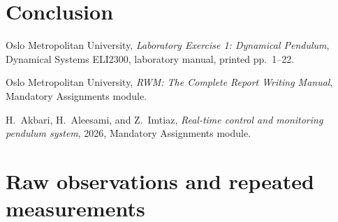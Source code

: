 \documentclass[11pt,a4paper]{article}
\newif\ifdraft
\DeclareRobustCommand{\guide}[1]{\ifdraft\par\smallskip\small\itshape Draft guidance: #1\par\smallskip\fi}
\newcommand{\manual}[1]{\cite[printed pp.~#1]{labmanual}}
\begin{document}
\section{Conclusion}
\label{sec:conclusion}
\guide{Summarise the principal findings about natural stability, feedback stabilisation, and disturbance rejection, using your measured results and their uncertainties. Requirement: \manual{21}. Assistant writing suggestion: keep this short and do not introduce new evidence.}

\clearpage
{}
{}
\begin{thebibliography}{9}
Oslo Metropolitan University,
\textit{Laboratory Exercise 1: Dynamical Pendulum},
Dynamical Systems ELI2300, laboratory manual, printed pp.~1--22.

Oslo Metropolitan University,
\textit{RWM: The Complete Report Writing Manual},
Mandatory Assignments module.

H.~Akbari, H.~Aleesami, and Z.~Imtiaz,
\textit{Real-time control and monitoring pendulum system},
2026, Mandatory Assignments module.
\end{thebibliography}
\guide{Reference details above reproduce those available in the manual, printed pp.~21--22. Consult and cite RWM \cite{rwm} and the technical reference where actually used; add any additional sources. Do not claim to have consulted documents you have not read.}

\clearpage
\appendix
\section{Raw observations and repeated measurements}
\label{app:raw}
\guide{Attachments must contain all raw observations and repeated measurements. Duplicate the templates below for each separate trial or independent measurement, recording observer and trial/reading ID. Sources: \manual{10, 21--22}.}
\end{document}
